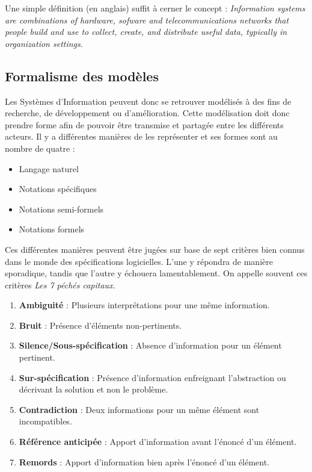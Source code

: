 \documentclass[../Syllabus.tex]{subfiles}
\begin{document}
Une simple définition (en anglais) suffit à cerner le concept : \textit{Information systems are combinations of hardware, sofware and telecommunications networks that people build and use to collect, create, and distribute useful data, typically in organization settings}.

\subsection{Formalisme des modèles}

Les Systèmes d'Information peuvent donc se retrouver modélisés à des fins de recherche, de développement ou d'amélioration. Cette modélisation doit donc prendre forme afin de pouvoir être transmise et partagée entre les différents acteurs. Il y a différentes manières de les représenter et ses formes sont au nombre de quatre :

\begin{itemize}
  \item Langage naturel
  \item Notations spécifiques
  \item Notations semi-formels
  \item Notations formels
\end{itemize}

Ces différentes manières peuvent être jugées sur base de sept critères bien connus dans le monde des spécifications logicielles. L'une y répondra de manière sporadique, tandis que l'autre y échouera lamentablement. On appelle souvent ces critères \textit{Les 7 péchés capitaux}.

\begin{enumerate}
  \item \textbf{Ambiguité} : Plusieurs interprétations pour une même information.
  \item \textbf{Bruit} : Présence d'éléments non-pertinents.
  \item \textbf{Silence/Sous-spécification} : Absence d'information pour un élément pertinent.
  \item \textbf{Sur-spécification} : Présence d'information enfreignant l'abstraction ou décrivant la solution et non le problème.
  \item \textbf{Contradiction} : Deux informations pour un même élément sont incompatibles.
  \item \textbf{Référence anticipée} : Apport d'information avant l'énoncé d'un élément.
  \item \textbf{Remords} : Apport d'information bien après l'énoncé d'un élément.
\end{enumerate}
\end{document}
